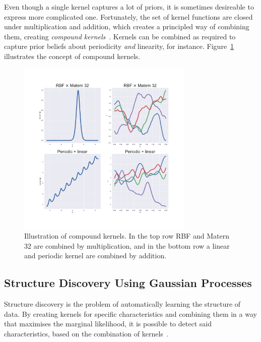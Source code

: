 Even though a single kernel captures a lot of priors, it is sometimes
desireable to express more complicated one. Fortunately,
the set of kernel functions are closed under multiplication and addition, which
creates a principled way of combining them, creating \textit{compound
  kernels}~\cite{duvenaud2013structure}. Kernels can be combined as
required to capture prior beliefs about periodicity \textit{and}
linearity, for instance. Figure~\ref{fig:compound-kernels} illustrates
the concept of compound kernels.
\begin{figure}
  \centering
  \includegraphics[width=0.75\textwidth]{figures/compound-kernels}
  \caption{Illustration of compound kernels. In the top row RBF
    and Matern 32 are combined by multiplication, and in the bottom
    row a linear and periodic kernel are combined by addition.}\label{fig:compound-kernels}
\end{figure}

\subsection{Structure Discovery Using Gaussian Processes}
Structure discovery is the problem of automatically learning the
structure of data. By creating kernels for specific characteristics
and combining them in a way that maximises the marginal likelihood, it
is possible to detect said characteristics, based on the combination
of kernels~\cite{duvenaud2013structure}.

